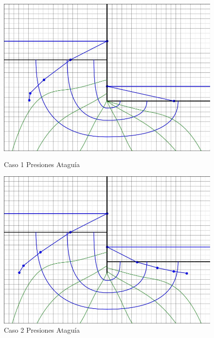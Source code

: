 \begin{figure}[H]
  \centering
  \begin{minipage}{0.32\textwidth}
      \centering
      \includegraphics[width=\textwidth]{FOTOS/caso_1_presion_ataquia_total.jpg}
      \caption{Caso 1 Presiones Ataguía}
  \end{minipage}
  \begin{minipage}{0.32\textwidth}
      \centering
      \includegraphics[width=\textwidth]{FOTOS/caso_2_presion_ataquia_total.jpg}
      \caption{Caso 2 Presiones Ataguía}
  \end{minipage}
  \begin{minipage}{0.32\textwidth}
      \centering

\end{minipage}
\end{figure}
